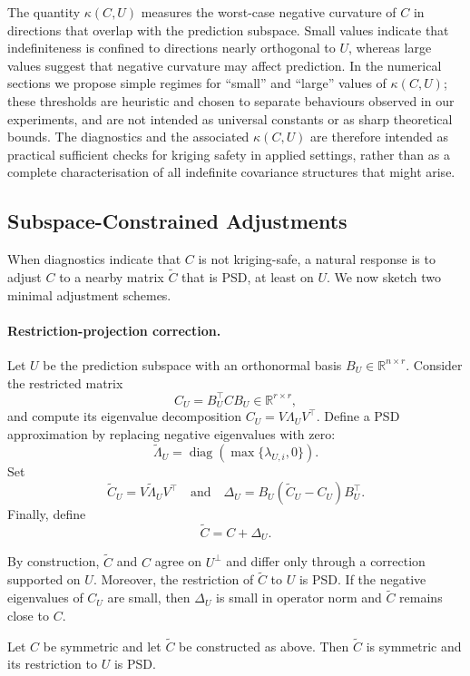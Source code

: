 \documentclass[smallextended]{svjour3}
\newcommand{\R}{\mathbb{R}}
\newcommand{\T}{\top}
\newcommand{\1}{\mathbf{1}}
\DeclareMathOperator{\diag}{diag}
\let\oldproposition\proposition
\let\endoldproposition\endproposition
\renewenvironment{proposition}{\oldproposition\upshape}{\endoldproposition}
\begin{document}
The quantity $\kappa(C,U)$ measures the worst-case negative curvature of $C$ in directions that overlap with the prediction subspace. Small values indicate that indefiniteness is confined to directions nearly orthogonal to $U$,
whereas large values suggest that negative curvature may affect prediction. In the numerical sections we propose simple regimes for ``small'' and ``large'' values of $\kappa(C,U)$; these thresholds are heuristic and chosen
to separate behaviours observed in our experiments, and are not intended as universal constants or as sharp theoretical bounds. The diagnostics and the associated $\kappa(C,U)$  are therefore intended as practical sufficient checks for kriging safety in applied settings, rather than as a complete characterisation of all indefinite covariance structures that might arise.

\subsection{Subspace-Constrained Adjustments}

When diagnostics indicate that $C$ is not kriging-safe, a natural response is to adjust $C$ to a nearby matrix $\tilde{C}$ that is PSD, at least on $U$.
We now sketch two minimal adjustment schemes.

\paragraph{Restriction-projection correction.}
Let $U$ be the prediction subspace with an orthonormal basis $B_U \in \R^{n \times r}$.
Consider the restricted matrix
\[
C_U = B_U^{\T} C B_U \in \R^{r \times r},
\]
and compute its eigenvalue decomposition $C_U = V \Lambda_U V^{\T}$.
Define a PSD approximation by replacing negative eigenvalues with zero:
\[
\tilde{\Lambda}_U = \diag(\max\{\lambda_{U,i},0\}).
\]
Set
\[
\tilde{C}_U = V \tilde{\Lambda}_U V^{\T}
\quad\text{and}\quad
\Delta_U = B_U (\tilde{C}_U - C_U) B_U^{\T}.
\]
Finally, define
\[
\tilde{C} = C + \Delta_U.
\]

By construction, $\tilde{C}$ and $C$ agree on $U^{\perp}$ and differ only through a correction supported on $U$.
Moreover, the restriction of $\tilde{C}$ to $U$ is PSD.
If the negative eigenvalues of $C_U$ are small, then $\Delta_U$ is small in operator norm and $\tilde{C}$ remains close to $C$.

\begin{proposition}[Subspace-constrained PSD correction]
\label{prop:subspace-psd}
Let $C$ be symmetric and let $\tilde{C}$ be constructed as above.
Then $\tilde{C}$ is symmetric and its restriction to $U$ is PSD.
\end{proposition}	
\end{document}

